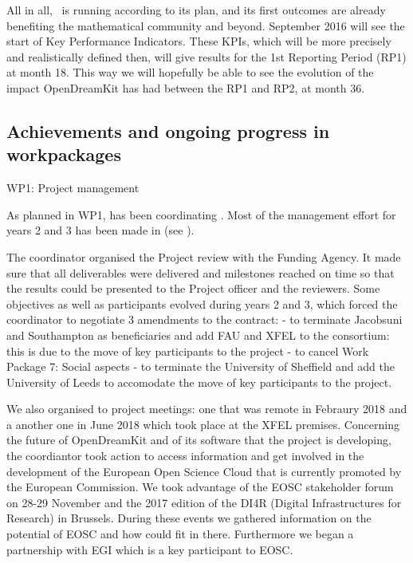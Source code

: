 \documentclass{deliverablereport}
\makeatletter
\renewcommand\subsubsection{\@startsection{subsubsection}{2}%
  \z@{.5\linespacing\@plus.7\linespacing}{.1\linespacing}%
  {\normalfont\bfseries}}
\makeatother
\begin{document}
All in all, \ODK\ is running according to its plan, and its first
outcomes are already benefiting the mathematical community and
beyond. September 2016 will see the start of Key Performance
Indicators.  These KPIs, which will be more precisely and
realistically defined then, will give results for the 1st Reporting
Period (RP1) at month 18.  This way we will hopefully be able to see the
evolution of the impact OpenDreamKit has had between the RP1 and RP2,
at month 36.



\subsection{Achievements and ongoing progress in workpackages}

\subsubsection{WP1: Project management}

As planned in WP1,  has been coordinating \ODK.  Most of the
management effort for years 2 and 3 has been made in
 (see
).  

The coordinator organised the Project review with the Funding Agency. It made sure that all deliverables were delivered and milestones reached on time so that the results could be presented to the Project officer and the reviewers.
Some objectives as well as participants evolved during years 2 and 3, which forced the coordinator to negotiate 3 amendments to the contract:
- to terminate Jacobsuni and Southampton as beneficiaries and add FAU and XFEL to the consortium: this is due to the move of key participants to the project
- to cancel Work Package 7: Social aspects
- to terminate the University of Sheffield and add the University of Leeds to accomodate the move of key participants to the project.


We also organised to project meetings: one that was remote in Febraury 2018 and a another one in June 2018 which took place at the XFEL premises.
Concerning the future of OpenDreamKit and of its software that the project is developing, the coordiantor took action to access information and get involved in the development of the European Open Science Cloud that is currently promoted by the European Commission. We took advantage of the EOSC stakeholder forum on 28-29 November and the 2017 edition of the DI4R (Digital Infrastructures for Research) in Brussels. During these events we gathered information on the potential of EOSC and how \ODK could fit in there. Furthermore we began a partnership with EGI which is a key participant to EOSC.
\end{document}
